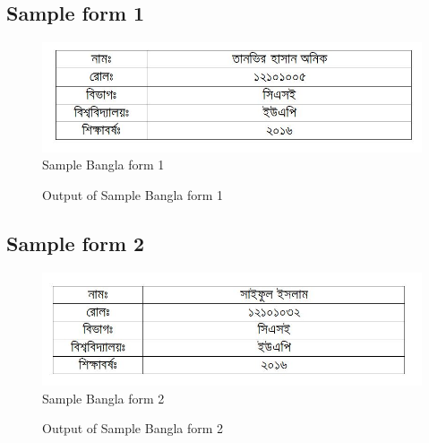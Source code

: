 \subsection{Sample form 1}
\begin{figure}[H]
\centering
\includegraphics[width=1\textwidth]{formBen01}
\caption {Sample Bangla form 1}
\label {fig:FormBan1}
\end{figure}
\begin{figure}[H]
\centering
{}
\caption {Output of Sample Bangla form 1}
\label {fig:FormBanOut1}
\end{figure}
\subsection{Sample form 2}
\begin{figure}[H]
\centering
\includegraphics[width=1\textwidth]{formBen02}
\caption {Sample Bangla form 2}
\label {fig:FormBan2}
\end{figure}
\begin{figure}[H]
\centering
{}
\caption {Output of Sample Bangla form 2}
\label {fig:FormBanOut2}
\end{figure}
